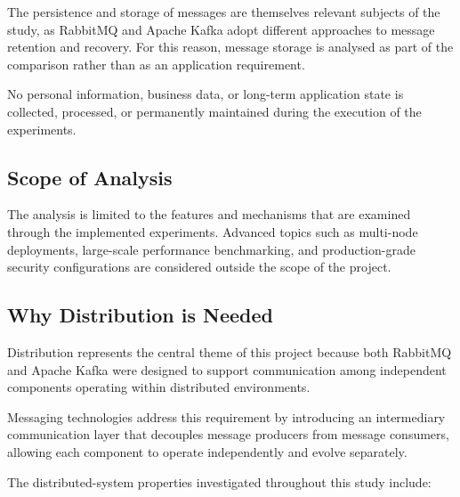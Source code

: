 \documentclass{scrartcl}
\begin{document}
The persistence and storage of messages are themselves relevant subjects of the study, as RabbitMQ and Apache Kafka adopt different approaches to message retention and recovery. For this reason, message storage is analysed as part of the comparison rather than as an application requirement.

No personal information, business data, or long-term application state is collected, processed, or permanently maintained during the execution of the experiments.


\subsection{Scope of Analysis}

The analysis is limited to the features and mechanisms that are examined through the
implemented experiments. Advanced topics such as multi-node deployments, large-scale
performance benchmarking, and production-grade security configurations are considered
outside the scope of the project.


\subsection{Why Distribution is Needed}

Distribution represents the central theme of this project because both RabbitMQ and Apache Kafka were designed to support communication among independent components operating within distributed environments.

 Messaging technologies address this requirement by introducing an intermediary communication layer that decouples message producers from message consumers, allowing each component to operate independently and evolve separately.

The distributed-system properties investigated throughout this study include:
\end{document}
